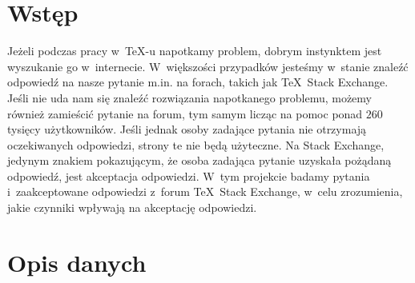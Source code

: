 \documentclass[12pt]{article}
\begin{document}
	\maketitle
	\tableofcontents
	\newpage

	\section{Wstęp}\label{sec:wstep}

	Jeżeli podczas pracy w~\TeX-u napotkamy problem, dobrym instynktem jest wyszukanie go w~internecie.
	W~większości przypadków jesteśmy w~stanie znaleźć odpowiedź na nasze pytanie m.in. na forach, takich jak \TeX~Stack Exchange.
	Jeśli nie uda nam się znaleźć rozwiązania napotkanego problemu, możemy również zamieścić pytanie na forum, tym samym licząc na pomoc ponad $260$ tysięcy użytkowników.
	Jeśli jednak osoby zadające pytania nie otrzymają oczekiwanych odpowiedzi, strony te nie będą użyteczne.
	Na Stack Exchange, jedynym znakiem pokazującym, że osoba zadająca pytanie uzyskała pożądaną odpowiedź, jest akceptacja odpowiedzi.
	W~tym projekcie badamy pytania i~zaakceptowane odpowiedzi z~forum \TeX~Stack Exchange, w~celu zrozumienia, jakie czynniki wpływają na akceptację odpowiedzi.

	\section{Opis danych}\label{sec:opis-danych}
\end{document}
